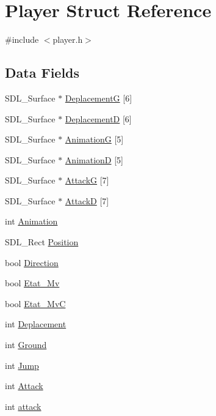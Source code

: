 \hypertarget{structPlayer}{}\section{Player Struct Reference}
\label{structPlayer}


{\ttfamily \#include $<$player.\+h$>$}

\subsection*{Data Fields}
\begin{DoxyCompactItemize}
\item 
S\+D\+L\+\_\+\+Surface $\ast$ \hyperlink{structPlayer_a9dabac85ae31980a1b912694d89d95de}{DeplacementG} \mbox{[}6\mbox{]}
\item 
S\+D\+L\+\_\+\+Surface $\ast$ \hyperlink{structPlayer_acb3399f7e60d2be41d7aa1cee3ec4e66}{DeplacementD} \mbox{[}6\mbox{]}
\item 
S\+D\+L\+\_\+\+Surface $\ast$ \hyperlink{structPlayer_a6608c060fd0e9def58e13bad4f19d500}{AnimationG} \mbox{[}5\mbox{]}
\item 
S\+D\+L\+\_\+\+Surface $\ast$ \hyperlink{structPlayer_a5122ccb8f74095c280a24bfa19d390a7}{AnimationD} \mbox{[}5\mbox{]}
\item 
S\+D\+L\+\_\+\+Surface $\ast$ \hyperlink{structPlayer_a97acdb37024b80bb43aa293589ba2b22}{AttackG} \mbox{[}7\mbox{]}
\item 
S\+D\+L\+\_\+\+Surface $\ast$ \hyperlink{structPlayer_ae7482c585104ebbeb49fa60a8d6362f6}{AttackD} \mbox{[}7\mbox{]}
\item 
int \hyperlink{structPlayer_a3b144e1fee7b4f1baae1f26374416a85}{Animation}
\item 
S\+D\+L\+\_\+\+Rect \hyperlink{structPlayer_a790577b95757d4f7b27442264fdee116}{Position}
\item 
bool \hyperlink{structPlayer_ade89420a62ced088d3fd382af791cec3}{Direction}
\item 
bool \hyperlink{structPlayer_ac078c2779ae4431e571b6062d5e27c52}{Etat\+\_\+\+Mv}
\item 
bool \hyperlink{structPlayer_a38cd0b30353c30c150faa071198f5413}{Etat\+\_\+\+MvC}
\item 
int \hyperlink{structPlayer_adc1d5ec9edec35b7ed2a9eebc6d69d40}{Deplacement}
\item 
int \hyperlink{structPlayer_a0edea7ee3c5c7ef5d934fcafd9536c4f}{Ground}
\item 
int \hyperlink{structPlayer_a990b8343eb6aec2ce445f37b741c536f}{Jump}
\item 
int \hyperlink{structPlayer_a5282fb2b8a94ae294d5ed86a91a58d0d}{Attack}
\item 
int \hyperlink{structPlayer_af831c1c11251f76c63e99cc069517885}{attack}
\end{DoxyCompactItemize}


